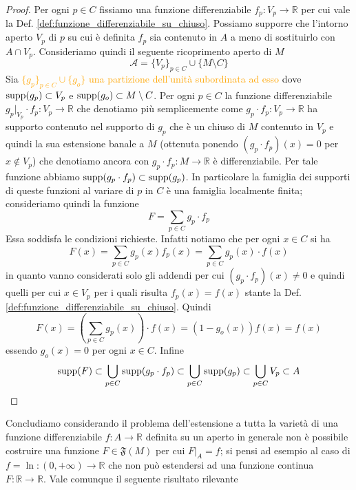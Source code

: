         \begin{proof}
        Per ogni $p \in C$ fissiamo una funzione differenziabile $f_p \colon V_p \to \mathbb{R}$ per cui vale la Def. \ref{def:funzione_differenziabile_su_chiuso}. Possiamo supporre che l'intorno aperto $V_p$ di $p$ su cui è definita $f_p$ sia contenuto in $A$ a meno di sostituirlo con $A \cap V_p$. Consideriamo quindi il seguente ricoprimento aperto di $M$
        \[
        \mathcal{A} = \{V_p\}_{p \in C} \cup \{M \setminus C\}
        \]
        Sia \textcolor{orange}{$\{g_p\}_{p \in C} \cup \{g_o\}$ una partizione dell'unità subordinata ad esso} dove $\operatorname{supp}(g_p) \subset V_p$ e $\operatorname{supp}(g_o) \subset M \setminus C$. Per ogni $p \in C$ la funzione differenziabile $g_p|_{V_p} \cdot f_p \colon V_p \to \mathbb{R}$ che denotiamo più semplicemente come $g_p \cdot f_p \colon V_p \to \mathbb{R}$ ha supporto contenuto nel supporto di $g_p$ che è un chiuso di $M$ contenuto in $V_p$ e quindi la sua estensione banale a $M$ (ottenuta ponendo $(g_p \cdot f_p)(x) = 0$ per $x \notin V_p$) che denotiamo ancora con $g_p \cdot f_p \colon M \to \mathbb{R}$ è differenziabile. Per tale funzione abbiamo $\operatorname{supp}(g_p \cdot f_p) \subset \operatorname{supp}(g_p)$. In particolare la famiglia dei supporti di queste funzioni al variare di $p$ in $C$ è una famiglia localmente finita; consideriamo quindi la funzione
        \[
        F = \sum_{p \in C} g_p \cdot f_p
        \]
        Essa soddisfa le condizioni richieste. Infatti notiamo che per ogni $x \in C$ si ha
        \[
        F(x) = \sum_{p \in C} g_p(x) f_p(x) = \sum_{p \in C} g_p(x) \cdot f(x)
        \]
        in quanto vanno considerati solo gli addendi per cui $(g_p \cdot f_p)(x) \neq 0$ e quindi quelli per cui $x \in V_p$ per i quali risulta $f_p(x) = f(x)$ stante la Def. \ref{def:funzione_differenziabile_su_chiuso}. Quindi
        \[
        F(x) = \left(\sum_{p \in C} g_p(x)\right) \cdot f(x) = (1 - g_o(x)) f(x) = f(x)
        \]
        essendo $g_o(x) = 0$ per ogni $x \in C$. Infine
        \[
        \operatorname{supp}(F) \subset \bigcup_{p \in C} \operatorname{supp}(g_p \cdot f_p) \subset \bigcup_{p \in C} \operatorname{supp}(g_p) \subset \bigcup_{p \in C} V_p \subset A
        \]
        \end{proof}

        Concludiamo considerando il problema dell'estensione a tutta la varietà di una funzione differenziabile $f \colon A \to \mathbb{R}$ definita su un aperto in generale non è possibile costruire una funzione $F \in \mathfrak{F}(M)$ per cui $F|_A = f$; si pensi ad esempio al caso di $f = \ln \colon (0, +\infty) \to \mathbb{R}$ che non può estendersi ad una funzione continua $F \colon \mathbb{R} \to \mathbb{R}$. Vale comunque il seguente risultato rilevante

